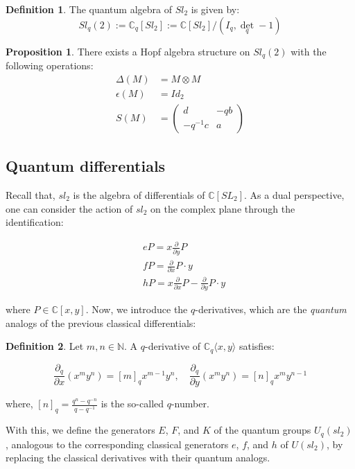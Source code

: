\documentclass[11pt]{article}
\theoremstyle{definition}
\newtheorem{Prop}{Proposition}[section]
\newtheorem{Def}{Definition}[section]
\begin{document}
\begin{Def} The quantum algebra of \(Sl_2\) is given by:
\[Sl_q(2):=\mathbb{C}_q[Sl_2]:=\mathbb{C}[Sl_2]/(I_q,\det_q-1)\]
\end{Def}

\begin{Prop} There exists a Hopf algebra structure on \(Sl_q(2)\) with the following operations:
\begin{align*}
\Delta(M) &= M\otimes M\\
\epsilon(M) &= Id_2\\
S(M) &= \begin{pmatrix} d & -qb \\ -q^{-1}c & a \end{pmatrix}
\end{align*}
\end{Prop}

\subsection{\Large \textbf{Quantum differentials}}
Recall that, \(sl_2\) is the algebra of differentials of \(\mathbb{C}[SL_2]\). As a dual perspective, one can consider the action of \(sl_2\) on the complex plane through the identification:

\begin{align*}
&eP=x\frac{\partial}{\partial y} P \\
&fP=\frac{\partial}{\partial x} P\cdot y \\
&hP=x\frac{\partial}{\partial x}P-\frac{\partial}{\partial y}P\cdot y 
\end{align*}

where \(P\in\mathbb{C}[x,y]\). Now, we introduce the \(q\)-derivatives, which are the \textit{quantum} analogs of the previous classical differentials:

\begin{Def} Let \(m,n\in\mathbb{N}\). A \(q\)-derivative of \(\mathbb{C}_q\langle x,y\rangle\) satisfies:

\[\frac{\partial_q}{\partial x}(x^my^n)=[m]_qx^{m-1}y^{n}, \quad \frac{\partial_q}{\partial y}(x^my^n)=[n]_qx^{m}y^{n-1}\]

where, \([n]_q=\frac{q^n-q^{-n}}{q-q^{-1}}\) is the so-called \(q\)-number.
\end{Def}

With this, we define the generators \(E\), \(F\), and \(K\) of the quantum groups \(U_q(sl_2)\), analogous to the corresponding classical generators \(e\), \(f\), and \(h\) of \(U(sl_2)\), by replacing the classical derivatives with their quantum analogs.
\end{document}
